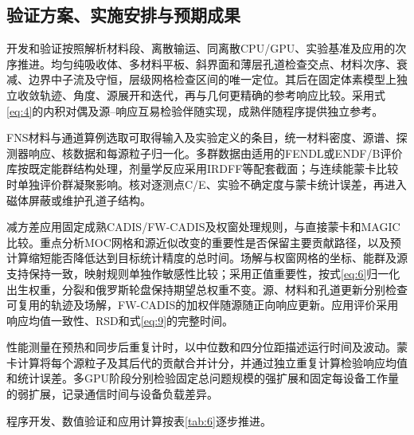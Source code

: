 \documentclass[UTF8, zihao=-4, fontset=none, a4paper]{ctexart}
\begin{document}
\subsection{验证方案、实施安排与预期成果}

开发和验证按照解析材料段、离散输运、同离散CPU/GPU、实验基准及应用的次序推进。均匀纯吸收体、多材料平板、斜界面和薄层孔道检查交点、材料次序、衰减、边界中子流及守恒，层级网格检查区间的唯一定位。其后在固定体素模型上独立收敛轨迹、角度、源展开和迭代，再与几何更精确的参考响应比较。采用式\eqref{eq:4}的内积对偶及源--响应互易检验伴随实现，成熟伴随程序提供独立参考。

FNS材料与通道算例选取可取得输入及实验定义的条目，统一材料密度、源谱、探测器响应、核数据和每源粒子归一化。多群数据由适用的FENDL或ENDF/B评价库按既定能群结构处理，剂量学反应采用IRDFF等配套截面；与连续能蒙卡比较时单独评价群凝聚影响。核对逐测点C/E、实验不确定度与蒙卡统计误差，再进入磁体屏蔽或维护孔道子结构。

减方差应用固定成熟CADIS/FW-CADIS及权窗处理规则，与直接蒙卡和MAGIC比较。重点分析MOC网格和源近似改变的重要性是否保留主要贡献路径，以及预计算缩短能否降低达到目标统计精度的总时间。场解与权窗网格的坐标、能群及源支持保持一致，映射规则单独作敏感性比较；采用正值重要性，按式\eqref{eq:6}归一化出生权重，分裂和俄罗斯轮盘保持期望总权重不变。源、材料和孔道更新分别检查可复用的轨迹及场解，FW-CADIS的加权伴随源随正向响应更新。应用评价采用响应均值一致性、RSD和式\eqref{eq:9}的完整时间。

性能测量在预热和同步后重复计时，以中位数和四分位距描述运行时间及波动。蒙卡计算将每个源粒子及其后代的贡献合并计分，并通过独立重复计算检验响应均值和统计误差。多GPU阶段分别检验固定总问题规模的强扩展和固定每设备工作量的弱扩展，记录通信时间与设备负载差异。

程序开发、数值验证和应用计算按表\ref{tab:6}逐步推进。
\end{document}
